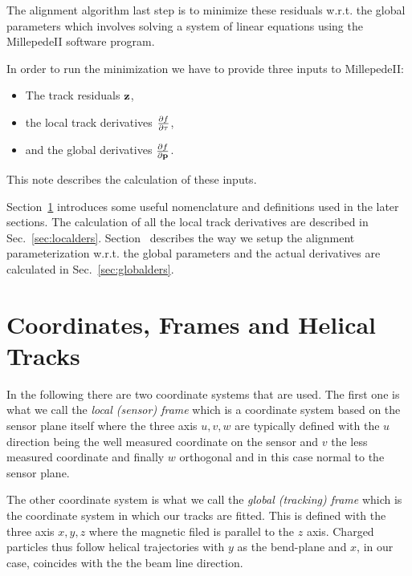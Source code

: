 \documentclass{article}
\def\vec#1{\ensuremath{\mathrm{\bf #1}}}
\def\partder#1#2{\ensuremath{\frac{\partial #1}{\partial #2}}}
\begin{document}
The alignment algorithm last step is to minimize these residuals w.r.t. the global parameters which 
involves solving a system of linear equations using the MillepedeII software program. 

In order to run the minimization we have to provide three inputs to MillepedeII:
\begin{itemize}
\item The track residuals \vec{z},
\item the local track derivatives $\partder{ f } {\vec{\tau}}$,
\item and the global derivatives $\partder{f}{\vec{p}}$.
\end{itemize}
This note describes the calculation of these inputs. 

Section~\ref{sec:helix} introduces some useful nomenclature and definitions used in the later 
sections. The calculation of all the local track derivatives are described in Sec.~\ref{sec:localders}. 
Section~\label{sec:param} describes the way we setup the alignment parameterization w.r.t. the 
global parameters and the actual derivatives are calculated in Sec.~\ref{sec:globalders}.








\section{Coordinates, Frames and Helical Tracks}
\label{sec:helix}

In the following there are two coordinate systems that are used. The first one is what we call 
the {\it local (sensor) frame} which is a coordinate system based on the sensor plane itself where
the three axis $u,v,w$ are typically defined with the $u$ direction being the well measured 
coordinate on the sensor and $v$ the less measured coordinate and finally $w$ orthogonal and 
in this case normal to the sensor plane. 

The other coordinate system is what we call the {\it global (tracking) frame} which is the coordinate 
system in which our tracks are fitted. This is defined with the three axis $x,y,z$ where the magnetic 
filed is parallel to the $z$ axis.
Charged particles thus follow helical trajectories with $y$ as the bend-plane and $x$, in our case, coincides with the the beam line direction. 
\end{document}
